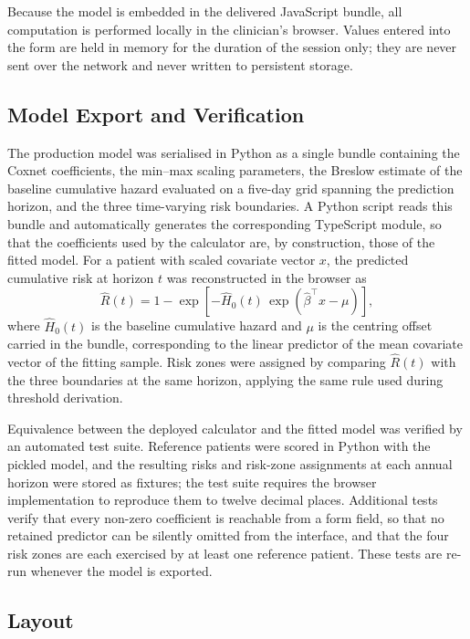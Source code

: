 Because the model is embedded in the delivered JavaScript bundle, all computation is performed locally in the clinician's browser. Values entered into the form are held in memory for the duration of the session only; they are never sent over the network and never written to persistent storage.

\subsection{Model Export and Verification}

The production model was serialised in Python as a single bundle containing the Coxnet coefficients, the min--max scaling parameters, the Breslow estimate of the baseline cumulative hazard evaluated on a five-day grid spanning the prediction horizon, and the three time-varying risk boundaries. A Python script reads this bundle and automatically generates the corresponding TypeScript module, so that the coefficients used by the calculator are, by construction, those of the fitted model. For a patient with scaled covariate vector $x$, the predicted cumulative risk at horizon $t$ was reconstructed in the browser as
\begin{equation}
    \widehat{R}(t) = 1 - \exp\!\left[-\widehat{H}_0(t)\,\exp\!\left(\hat{\beta}^{\top}x - \mu\right)\right],
\end{equation}
where $\widehat{H}_0(t)$ is the baseline cumulative hazard and $\mu$ is the centring offset carried in the bundle, corresponding to the linear predictor of the mean covariate vector of the fitting sample. Risk zones were assigned by comparing $\widehat{R}(t)$ with the three boundaries at the same horizon, applying the same rule used during threshold derivation.

Equivalence between the deployed calculator and the fitted model was verified by an automated test suite. Reference patients were scored in Python with the pickled model, and the resulting risks and risk-zone assignments at each annual horizon were stored as fixtures; the test suite requires the browser implementation to reproduce them to twelve decimal places. Additional tests verify that every non-zero coefficient is reachable from a form field, so that no retained predictor can be silently omitted from the interface, and that the four risk zones are each exercised by at least one reference patient. These tests are re-run whenever the model is exported.

\subsection{Layout}

